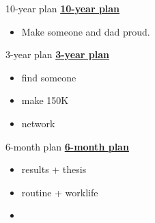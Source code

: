 \begin{multicols}{4}
\begin{columns}
\fi

\ifdefined\POSTER
  \begin{column}{0.5\columnwidth}
    \begin{block}{10-year plan}   %
\else
 \underline{\bf 10-year plan}
\fi
      \begin{itemize}
      \item \small Make someone and dad proud.
      \end{itemize}
\ifdefined\POSTER
    \end{block}
\fi

\ifdefined\POSTER
    \begin{block}{3-year plan}
\else
\underline{\bf 3-year plan}
\fi
      \begin{itemize}
      \item \small find someone
      \item \small make 150K
      \item \small network
      \end{itemize}
\ifdefined\POSTER
    \end{block}
\fi

\ifdefined\POSTER
    \begin{block}{6-month plan}
\else
\underline{\bf 6-month plan}
\fi
        \begin{itemize}
          \small \item \small results + thesis
          \item \small routine + worklife
          \item \small
          \end{itemize}
\ifdefined\POSTER
    \end{block}
\fi


\end{column}
\end{columns}
\end{multicols}
